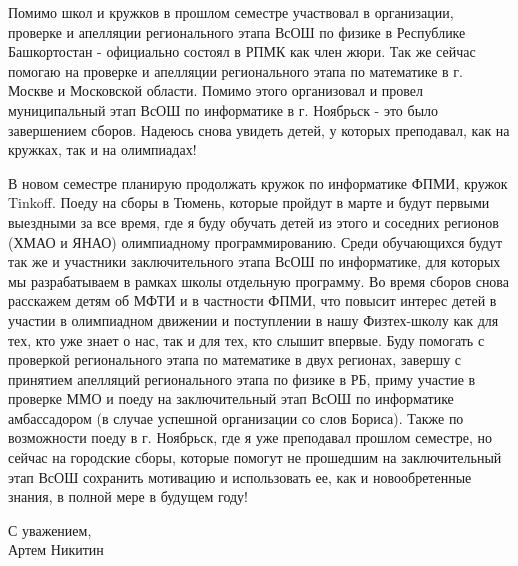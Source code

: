 \quad Помимо школ и кружков в прошлом семестре участвовал в организации, проверке и апелляции регионального этапа ВсОШ по физике в Республике
Башкортостан - официально состоял в РПМК как член жюри. Так же сейчас помогаю на проверке и апелляции регионального этапа по математике в
г. Москве и Московской области. Помимо этого организовал и провел муниципальный этап ВсОШ по информатике в г. Ноябрьск - это было завершением
сборов. Надеюсь снова увидеть детей, у которых преподавал, как на кружках, так и на олимпиадах!

\quad В новом семестре планирую продолжать кружок по информатике ФПМИ, кружок Tinkoff. Поеду на сборы в Тюмень, которые пройдут в марте и будут
первыми выездными за все время, где я буду обучать детей из этого и соседних регионов (ХМАО и ЯНАО) олимпиадному программированию. Среди
обучающихся будут так же и участники заключительного этапа ВсОШ по информатике, для которых мы разрабатываем в рамках школы отдельную
программу. Во время сборов снова расскажем детям об МФТИ и в частности ФПМИ, что повысит интерес детей в участии в олимпиадном движении и
поступлении в нашу Физтех-школу как для тех, кто уже знает о нас, так и для тех, кто слышит впервые. Буду помогать с проверкой регионального
этапа по математике в двух регионах, завершу с принятием апелляций регионального этапа по физике в РБ, приму участие в проверке ММО и поеду на
заключительный этап ВсОШ по информатике амбассадором (в случае успешной организации со слов Бориса). Также по возможности поеду в г. Ноябрьск,
где я уже преподавал прошлом семестре, но сейчас на городские сборы, которые помогут не прошедшим на заключительный этап ВсОШ сохранить
мотивацию и использовать ее, как и новообретенные знания, в полной мере в будущем году!

\begin{flushright}
    С уважением, \\
    Артем Никитин
\end{flushright}
